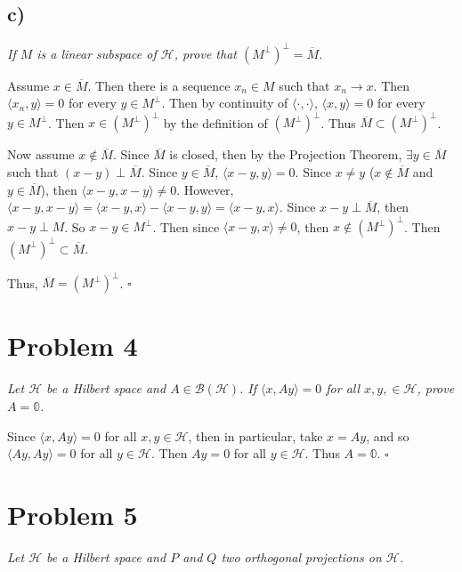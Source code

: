 \documentclass[12pt]{article}
\theoremstyle{plain}
\begin{document}
\subsection*{ c)}
\emph{If $M$ is a linear subspace of $\mathcal{H}$, prove that $(M^\perp)^\perp = \overline{M}$.} \medskip

Assume $x \in \overline{M}$.  Then there is a sequence $x_n \in M$ such that $x_n \rightarrow x$.  Then $\langle x_n, y \rangle = 0$ for every $y \in M^\perp$.  Then by continuity of $\langle\cdot,\cdot\rangle$, $\langle x, y\rangle = 0$ for every $y \in M^\perp$.  Then $x \in (M^\perp)^\perp$ by the definition of $(M^\perp)^\perp$.  Thus $\overline{M} \subset (M^\perp)^\perp$. \medskip

Now assume $x \not\in \overline{M}$.  Since $\overline{M}$ is closed, then by the Projection Theorem, $\exists y \in \overline{M}$ such that $(x - y) \perp \overline{M}$.  Since $y \in \overline{M}$, $\langle x - y, y\rangle = 0$.  Since $x \neq y$ ($x \not\in \overline{M}$ and $y \in \overline{M}$), then $\langle x - y, x - y \rangle \neq 0$.  However, $\langle x - y, x - y \rangle = \langle x - y, x \rangle - \langle x - y, y \rangle = \langle x - y, x \rangle$.  Since $x - y \perp \overline{M}$, then $x - y \perp M$.  So $x - y \in M^\perp$.  Then since $\langle x - y, x \rangle \neq 0$, then $x \not\in (M^\perp)^\perp$.  Then $(M^\perp)^\perp \subset \overline{M}$. \medskip

Thus, $\overline{M} = (M^\perp)^\perp$. \hfill $\square$

\section*{Problem 4}
\emph{Let $\mathcal{H}$ be a Hilbert space and $A \in \mathcal{B}(\mathcal{H})$.  If $\langle x, Ay\rangle = 0$ for all $x, y, \in \mathcal{H}$, prove $A = \mathbb{0}$.} \medskip

Since $\langle x, Ay \rangle = 0$ for all $x,y \in \mathcal{H}$, then in particular, take $x = Ay$, and so $\langle Ay, Ay \rangle = 0$ for all $y \in \mathcal{H}$.  Then $Ay = 0$ for all $y \in \mathcal{H}$.  Thus $A = \mathbb{0}$. \hfill $\square$

\section*{Problem 5}
\emph{Let $\mathcal{H}$ be a Hilbert space and $P$ and $Q$ two orthogonal projections on $\mathcal{H}$.}
\end{document}
